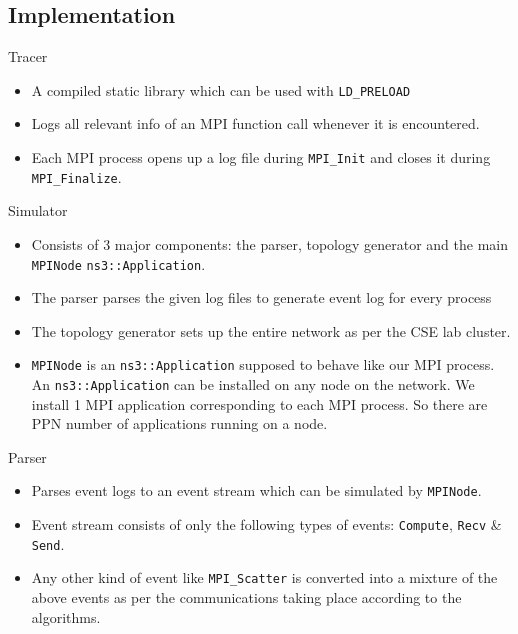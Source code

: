 \documentclass[pdf]{beamer}
\begin{document}
\subsection{Implementation}

\begin{frame}{Tracer}
  \begin{itemize}
    \item<1-> A compiled static library which can be used with
      \texttt{LD\_PRELOAD}
    \item<2-> Logs all relevant info of an MPI function call whenever it is
      encountered.
    \item<3-> Each MPI process opens up a log file during \texttt{MPI\_Init} and
      closes it during \texttt{MPI\_Finalize}.
  \end{itemize}
\end{frame}
\begin{frame}{Simulator}
  \begin{itemize}
    \item<1-> Consists of 3 major components: the parser, topology generator and
      the main \texttt{MPINode} \texttt{ns3::Application}.
    \item<2-> The parser parses the given log files to generate event log for
      every process
    \item<3-> The topology generator sets up the entire network as per the CSE
      lab cluster.
    \item<4-> \texttt{MPINode} is an \texttt{ns3::Application} supposed to
      behave like our MPI process. An \texttt{ns3::Application} can be installed
      on any node on the network. We install 1 MPI application corresponding to
      each MPI process. So there are PPN number of applications running on a
      node.
  \end{itemize}
\end{frame}
\begin{frame}{Parser}
  \begin{itemize}
    \item<1-> Parses event logs to an event stream which can be simulated by
      \texttt{MPINode}.
    \item<2-> Event stream consists of only the following types of events:
      \texttt{Compute}, \texttt{Recv} \& \texttt{Send}.
    \item<3-> Any other kind of event like \texttt{MPI\_Scatter} is converted
      into a mixture of the above events as per the communications taking place
      according to the algorithms.
  \end{itemize}
\end{frame}
\end{document}
